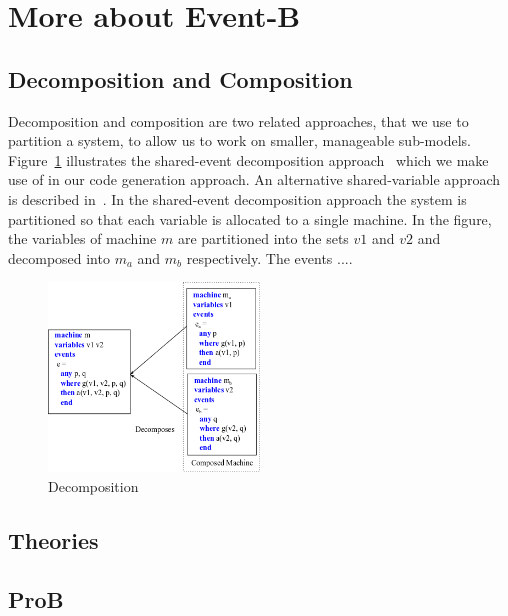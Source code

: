 \section{More about Event-B}

\subsection{Decomposition and Composition}

Decomposition and composition are two related approaches, that we use to partition a system, to allow us to work on smaller, manageable sub-models. Figure~\ref{fig:decomp2} illustrates the shared-event decomposition approach~\cite{decomp2010c} which we make use of in our code generation approach. An alternative shared-variable approach is described in~\cite{AbrialH07}. In the shared-event decomposition approach the system is partitioned so that each variable is allocated to a single machine. In the figure, the variables of machine $m$ are partitioned into the sets $v1$ and $v2$ and decomposed into $m_a$ and $m_b$ respectively. The events ....
\begin{figure}
\centering
\includegraphics[width=0.5\textwidth]{graphics/Decomp2.png}
\caption{Decomposition}
\label{fig:decomp2}
\end{figure}





\subsection{Theories}

\subsection{ProB}
